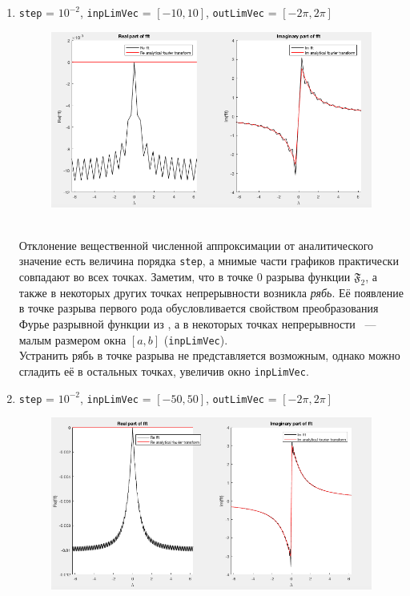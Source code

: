 \documentclass[11pt, oneside, draft]{article}
\numberwithin{equation}{section}
\begin{document}
    \begin{enumerate}
        \item
        \label{it:noise}
        \texttt{step} = \(10^{-2}\), \texttt{inpLimVec} = \( [-10, 10] \), \texttt{outLimVec} = \( [-2\pi, 2\pi] \)
        \begin{figure}[!h]
            \centering
            \includegraphics[width=\linewidth]{f2fig1}
            \label{pic:f2:1}
        \end{figure} \\
        Отклонение вещественной численной аппроксимации от аналитического значение есть величина порядка \texttt{step},
        а мнимые части графиков практически совпадают во всех точках.
        Заметим, что в точке 0 разрыва функции \(\mathfrak{F_2}\), а также в некоторых других точках непрерывности возникла \emph{рябь}.
        Её появление в точке разрыва первого рода обусловливается свойством преобразования Фурье разрывной функции из \cite{Roublev:fourier},
        а в некоторых точках непрерывности ~--- малым размером окна \([a, b]\) (\texttt{inpLimVec}).\\
        Устранить рябь в точке разрыва не представляется возможным, однако можно сгладить её в остальных точках, увеличив окно \texttt{inpLimVec}.
        \clearpage
        \item
        \label{it:lessnoise}
        \texttt{step} = \(10^{-2}\), \texttt{inpLimVec} = \( [-50, 50] \), \texttt{outLimVec} = \( [-2\pi, 2\pi] \)
        \begin{figure}[!h]
            \centering
            \includegraphics[width=\linewidth]{f2fig2}

\end{figure}
\end{enumerate}
\end{document}
